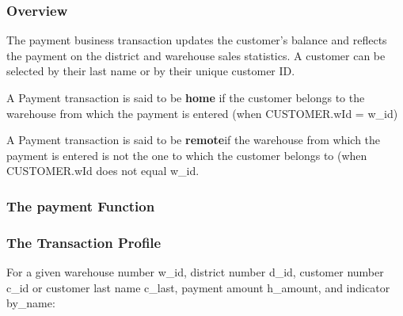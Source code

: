 \subsubsection {Overview}

The payment business transaction updates the customer's balance and reflects the payment on the district and warehouse sales statistics. A customer can be selected by their last name or by their unique customer ID.

A Payment transaction is said to be \textbf{home} if the customer belongs to the warehouse from which the payment is entered (when CUSTOMER.wId = w\_id)

A Payment transaction is said to be \textbf{remote}if the warehouse from which the payment is entered is not the one to which the customer belongs to (when CUSTOMER.wId does not equal w\_id.

\subsubsection{The payment Function}




\subsubsection{The Transaction Profile}

For a given warehouse number w\_id, district number d\_id, customer number c\_id or customer last name c\_last, payment amount h\_amount, and indicator by\_name:

